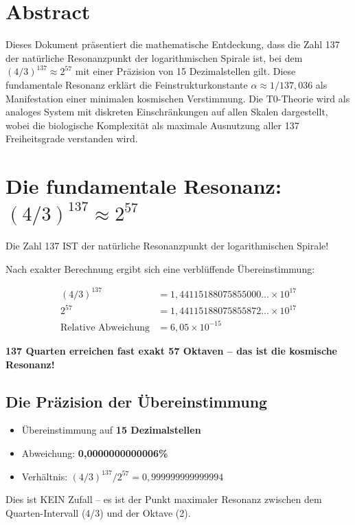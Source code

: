 \section*{Abstract}
		Dieses Dokument präsentiert die mathematische Entdeckung, dass die Zahl 137 der natürliche Resonanzpunkt der logarithmischen Spirale ist, bei dem $(4/3)^{137} \approx 2^{57}$ mit einer Präzision von 15 Dezimalstellen gilt. Diese fundamentale Resonanz erklärt die Feinstrukturkonstante $\alpha \approx 1/137{,}036$ als Manifestation einer minimalen kosmischen Verstimmung. Die T0-Theorie wird als analoges System mit diskreten Einschränkungen auf allen Skalen dargestellt, wobei die biologische Komplexität als maximale Ausnutzung aller 137 Freiheitsgrade verstanden wird.

	
	
	\section{Die fundamentale Resonanz: $(4/3)^{137} \approx 2^{57}$}
	
	Die Zahl 137 IST der natürliche Resonanzpunkt der logarithmischen Spirale!
	
	Nach exakter Berechnung ergibt sich eine verblüffende Übereinstimmung:
	
	\begin{align}
		(4/3)^{137} &= 1{,}44115188075855000... \times 10^{17}\\
		2^{57} &= 1{,}44115188075855872... \times 10^{17}\\
		\text{Relative Abweichung} &= 6{,}05 \times 10^{-15}
	\end{align}
	
	\textbf{137 Quarten erreichen fast exakt 57 Oktaven -- das ist die kosmische Resonanz!}
	
	\subsection{Die Präzision der Übereinstimmung}
	
	\begin{itemize}
		\item Übereinstimmung auf \textbf{15 Dezimalstellen}
		\item Abweichung: \textbf{0{,}0000000000006\%}
		\item Verhältnis: $(4/3)^{137} / 2^{57} = 0{,}999999999999994$
	\end{itemize}
	
	Dies ist KEIN Zufall -- es ist der Punkt maximaler Resonanz zwischen dem Quarten-Intervall (4/3) und der Oktave (2).
	
